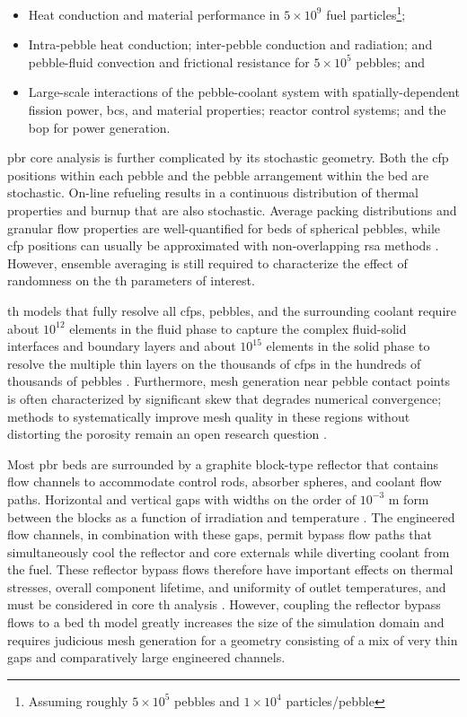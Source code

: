 \begin{itemize}
\item Heat conduction and material performance in \(5\times10^9\) fuel particles\hspace{0.02cm}\footnote{Assuming roughly \(5\times10^5\) pebbles and \(1\times10^4\) particles/pebble}; 
\item Intra-pebble heat conduction; inter-pebble conduction and radiation; and pebble-fluid convection and frictional resistance for \(5\times10^5\) pebbles; and
\item Large-scale interactions of the pebble-coolant system with spatially-dependent fission power, \glspl{bc}, and material properties; reactor control systems; and the \gls{bop} for power generation.
\end{itemize}

\gls{pbr} core analysis is further complicated by its stochastic geometry. Both the \gls{cfp} positions within each pebble and the pebble arrangement within the bed are stochastic. On-line refueling results in a continuous distribution of thermal properties and burnup that are also stochastic. Average packing distributions and granular flow properties are well-quantified for beds of spherical pebbles, while \gls{cfp} positions can usually be approximated with non-overlapping \gls{rsa} methods \cite{jodrey}. However, ensemble averaging is still required to characterize the effect of randomness on the \gls{th} parameters of interest.

\gls{th} models that fully resolve all \glspl{cfp}, pebbles, and the surrounding coolant require about \(10^{12}\) elements in the fluid phase to capture the complex fluid-solid interfaces and boundary layers \cite{wu2010} and about \(10^{15}\) elements in the solid phase to resolve the multiple thin layers on the thousands of \glspl{cfp} in the hundreds of thousands of pebbles \cite{novak_2019}. Furthermore, mesh generation near pebble contact points is often characterized by significant skew that degrades numerical convergence; methods to systematically improve mesh quality in these regions without distorting the porosity remain an open research question \cite{dixon,nijemeisland}.

Most \gls{pbr} beds are surrounded by a graphite block-type reflector that contains flow channels to accommodate control rods, absorber spheres, and coolant flow paths. Horizontal and vertical gaps with widths on the order of \(10^{-3}\) \si{\meter} form between the blocks as a function of irradiation and temperature \cite{guo_2018,liu_sas}. The engineered flow channels, in combination with these gaps, permit bypass flow paths that simultaneously cool the reflector and core externals while diverting coolant from the fuel. These reflector bypass flows therefore have important effects on thermal stresses, overall component lifetime, and uniformity of outlet temperatures, and must be considered in core \gls{th} analysis \cite{guo_2018,anderson}. However, coupling the reflector bypass flows to a bed \gls{th} model greatly increases the size of the simulation domain and requires judicious mesh generation for a geometry consisting of a mix of very thin gaps and comparatively large engineered channels.

